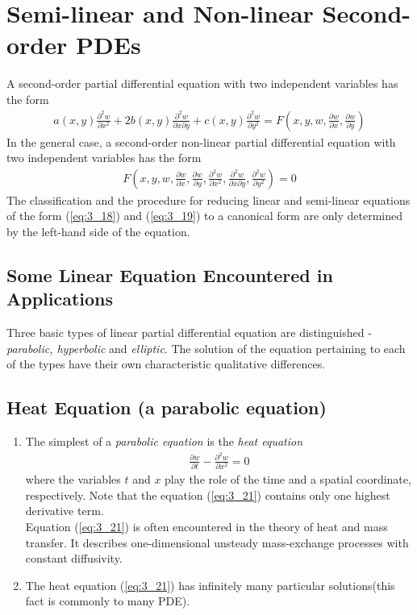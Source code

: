 \documentclass[11pt]{report}
\newcommand{\sps}{\\[0.2cm]}
\newcommand{\refn}[1]{(\ref{#1})}
\newcommand{\refx}[1]{\refn{eq:#1}}
\begin{document}
	\section{Semi-linear and Non-linear Second-order PDEs}
	A second-order partial differential equation with two independent variables has the form
	\begin{eqnarray}
		a(x,y)\frac{\partial^2 w}{\partial x^2} + 2b(x,y)\frac{\partial^2 w}{\partial x \partial y} + c(x,y)\frac{\partial^2 w}{\partial y^2} = F\left(x,y,w,\frac{\partial w}{\partial x},\frac{\partial w}{\partial y}\right)\label{eq:3_19}
	\end{eqnarray}
	In the general case, a second-order non-linear partial differential equation with two independent variables has the form
	\begin{eqnarray}
		F\left(x,y,w,\frac{\partial w}{\partial x},\frac{\partial w}{\partial y},\frac{\partial^2 w}{\partial x^2},\frac{\partial^2 w}{\partial x\partial y}, \frac{\partial^2 w}{\partial y^2}\right) = 0\label{eq:3_20}
	\end{eqnarray}
	The classification and the procedure for reducing linear and semi-linear equations of the form \refx{3_18} and \refx{3_19} to a canonical form are only determined by the left-hand side of the equation.
	
	\subsection{Some Linear Equation Encountered in Applications}
	Three basic types of linear partial differential equation are distinguished - \textit{parabolic, hyperbolic} and \textit{elliptic}. The solution of the equation pertaining to each of the types have their own characteristic qualitative differences.\sps
	
	\subsection{Heat Equation (a parabolic equation)}
	\begin{enumerate}
		\item The simplest of a \textit{parabolic equation} is the \textit{heat equation}
		\begin{eqnarray}
			\frac{\partial w}{\partial t} - \frac{\partial^2 w}{\partial x^2} = 0 \label{eq:3_21}
		\end{eqnarray}
		where the variables $t$ and $x$ play the role of the time and a spatial coordinate, respectively. Note that the equation \refx{3_21} contains only one highest derivative term.\\
		Equation \refx{3_21} is often encountered in the theory of heat and mass transfer. It describes one-dimensional unsteady mass-exchange processes with constant diffusivity.
		
		\item The heat equation \refx{3_21} has infinitely many particular solutions(this fact is commonly to many PDE).
	\end{enumerate}
	
\end{document}
